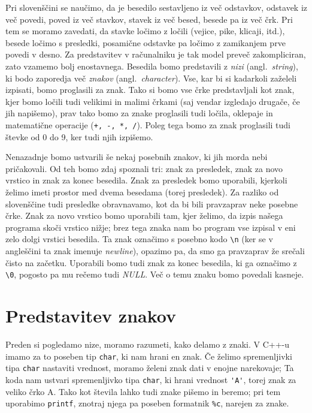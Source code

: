 \documentclass{book}
\begin{document}
Pri slovenščini se naučimo, da je besedilo sestavljeno iz več odstavkov,
odstavek iz več povedi, poved iz več stavkov, stavek iz več besed, besede pa iz
več črk.
Pri tem se moramo zavedati, da stavke ločimo z ločili (vejice, pike, klicaji,
itd.), besede ločimo s presledki, posamične odstavke pa ločimo z zamikanjem prve
povedi v desno.
Za predstavitev v računalniku je tak model preveč zakompliciran, zato vzamemo
bolj enostavnega.
Besedila bomo predstavili z \textit{nizi} (angl.~\textit{string}), ki bodo
zaporedja več \textit{znakov} (angl.~\textit{character}).
Vse, kar bi si kadarkoli zaželeli izpisati, bomo proglasili za znak.
Tako si bomo vse črke predstavljali kot znak, kjer bomo ločili tudi velikimi in
malimi črkami (saj vendar izgledajo drugače, če jih napišemo), prav tako bomo za
znake proglasili tudi ločila, oklepaje in matematične operacije
(\verb|+, -, *, /|).
Poleg tega bomo za znak proglasili tudi števke od 0 do 9, ker tudi njih
izpišemo.

Nenazadnje bomo ustvarili še nekaj posebnih znakov, ki jih morda nebi
pričakovali.
Od teh bomo zdaj spoznali tri: znak za presledek, znak za novo vrstico in znak
za konec besedila.
Znak za presledek bomo uporabili, kjerkoli želimo imeti prostor med dvema
besedama (torej presledek).
Za razliko od slovenščine tudi presledke obravnavamo, kot da bi bili pravzaprav
neke posebne črke.
Znak za novo vrstico bomo uporabili tam, kjer želimo, da izpis našega programa
skoči vrstico nižje; brez tega znaka nam bo program vse izpisal v eni zelo dolgi
vrstici besedila.
Ta znak označimo s posebno kodo \verb+\n+ (ker se v angleščini ta znak imenuje
\textit{newline}), opazimo pa, da smo ga pravzaprav že srečali čisto na začetku.
Uporabili bomo tudi znak za konec besedila, ki ga označimo z \verb+\0+,
pogosto pa mu rečemo tudi \textit{NULL}.
Več o temu znaku bomo povedali kasneje.

\section{Predstavitev znakov}

Preden si pogledamo nize, moramo razumeti, kako delamo z znaki.
V C++-u imamo za to poseben tip \verb+char+, ki nam hrani en znak.
Če želimo spremenljivki tipa \verb+char+ nastaviti vrednost, moramo želeni znak
dati v enojne narekovaje;
Ta koda nam ustvari spremenljivko tipa \verb+char+, ki hrani vrednost
\verb+'A'+, torej znak za veliko črko A.
Tako kot števila lahko tudi znake pišemo in beremo; pri tem uporabimo
\verb+printf+, znotraj njega pa poseben formatnik \verb+%c+, narejen za znake.
\end{document}
